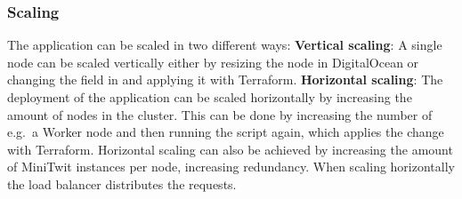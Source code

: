 \subsubsection{Scaling}\label{scaling}
The application can be scaled in two different ways: \textbf{Vertical
scaling}: A single node can be scaled vertically either by resizing the
node in DigitalOcean or changing the  field in
 and applying it with Terraform.
\textbf{Horizontal scaling}: The deployment of the application can be
scaled horizontally by increasing the amount of nodes in the cluster. This
can be done by increasing the  number of e.g.~a Worker
node and then running the  script 
again, which applies the change with Terraform.
Horizontal scaling can also be achieved by increasing the amount of MiniTwit instances per node, increasing redundancy.
When scaling horizontally the load balancer distributes the requests.
